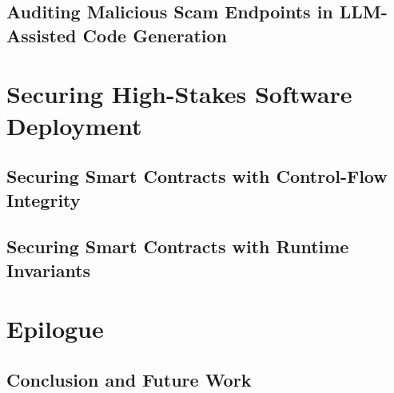 \documentclass{ut-thesis}
\begin{document}
    

    \chapter{Auditing Malicious Scam Endpoints in LLM-Assisted Code Generation}
    



    \part{Securing High-Stakes Software Deployment}
    \label{part:use}

    \chapter{Securing Smart Contracts with Control-Flow Integrity}
    

    \chapter{Securing Smart Contracts with Runtime Invariants}
     



    \part{Epilogue}

    \chapter{Conclusion and Future Work}
    


  \appendix

  \backmatter



{
% 


}
\end{document}
